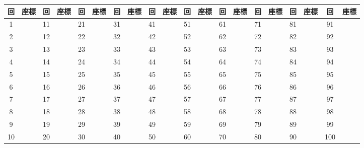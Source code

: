 \hspace*{-\parindent}
\begin{tabular}{|c|c|c|c|c|c|c|c|c|c|c|c|c|c|c|c|c|c|c|c|}
\hline
\scriptsize 回 & \scriptsize 座標 & \scriptsize 回 & \scriptsize 座標 & \scriptsize 回 & \scriptsize 座標 & \scriptsize 回 & \scriptsize 座標 & \scriptsize 回 & \scriptsize 座標 & \scriptsize 回 & \scriptsize 座標 & \scriptsize 回 & \scriptsize 座標 & \scriptsize 回 & \scriptsize 座標 & \scriptsize 回 & \scriptsize 座標 & \scriptsize 回 & \scriptsize 座標 \\
\hline\hline
\scriptsize 1 & & \scriptsize 11 && \scriptsize 21 && \scriptsize 31 && \scriptsize 41 && \scriptsize 51 && \scriptsize 61 && \scriptsize 71 && \scriptsize 81 && \scriptsize 91 & \\
\hline
\scriptsize 2 & & \scriptsize 12 && \scriptsize 22 && \scriptsize 32 && \scriptsize 42 && \scriptsize 52 && \scriptsize 62 && \scriptsize 72 && \scriptsize 82 && \scriptsize 92 & \\
\hline
\scriptsize 3 & & \scriptsize 13 && \scriptsize 23 && \scriptsize 33 && \scriptsize 43 && \scriptsize 53 && \scriptsize 63 && \scriptsize 73 && \scriptsize 83 && \scriptsize 93 & \\
\hline
\scriptsize 4 & & \scriptsize 14 && \scriptsize 24 && \scriptsize 34 && \scriptsize 44 && \scriptsize 54 && \scriptsize 64 && \scriptsize 74 && \scriptsize 84 && \scriptsize 94 & \\
\hline
\scriptsize 5 & & \scriptsize 15 && \scriptsize 25 && \scriptsize 35 && \scriptsize 45 && \scriptsize 55 && \scriptsize 65 && \scriptsize 75 && \scriptsize 85 && \scriptsize 95 & \\
\hline
\scriptsize 6 & & \scriptsize 16 && \scriptsize 26 && \scriptsize 36 && \scriptsize 46 && \scriptsize 56 && \scriptsize 66 && \scriptsize 76 && \scriptsize 86 && \scriptsize 96 & \\
\hline
\scriptsize 7 & & \scriptsize 17 && \scriptsize 27 && \scriptsize 37 && \scriptsize 47 && \scriptsize 57 && \scriptsize 67 && \scriptsize 77 && \scriptsize 87 && \scriptsize 97 & \\
\hline
\scriptsize 8 & & \scriptsize 18 && \scriptsize 28 && \scriptsize 38 && \scriptsize 48 && \scriptsize 58 && \scriptsize 68 && \scriptsize 78 && \scriptsize 88 && \scriptsize 98 & \\
\hline
\scriptsize 9& & \scriptsize 19 && \scriptsize 29 && \scriptsize 39 && \scriptsize 49 && \scriptsize 59 && \scriptsize 69 && \scriptsize 79 && \scriptsize 89 && \scriptsize 99 & \\
\hline
\scriptsize 10 & & \scriptsize 20 && \scriptsize 30 && \scriptsize 40 && \scriptsize 50 && \scriptsize 60 && \scriptsize 70 && \scriptsize 80 && \scriptsize 90 && \scriptsize 100 & \\
\hline
\end{tabular}


